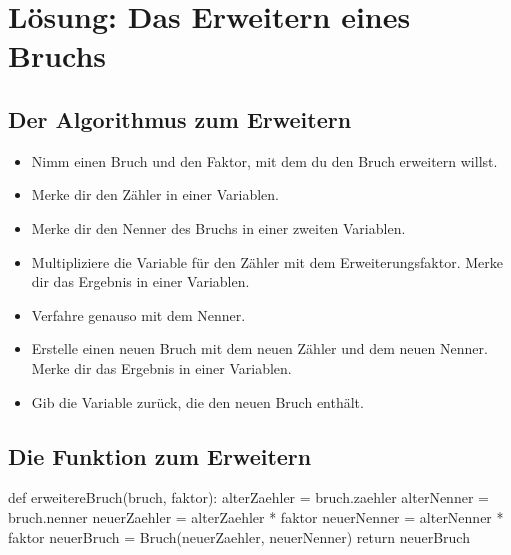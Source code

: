 \section{Lösung: Das Erweitern eines Bruchs}

\subsection*{Der Algorithmus zum Erweitern}

\begin{itemize}
	\item Nimm einen Bruch und den Faktor, mit dem du den Bruch erweitern willst.
	\item Merke dir den Zähler in einer Variablen.
	\item Merke dir den Nenner des Bruchs in einer zweiten Variablen.
	\item Multipliziere die Variable für den Zähler mit dem Erweiterungsfaktor. Merke dir das Ergebnis in einer Variablen.
	\item Verfahre genauso mit dem Nenner.
	\item Erstelle einen neuen Bruch mit dem neuen Zähler und dem neuen Nenner. Merke dir das Ergebnis in einer Variablen.
	\item Gib die Variable zurück, die den neuen Bruch enthält.
\end{itemize}

\subsection*{Die Funktion zum Erweitern}

\begin{codePython}
def erweitereBruch(bruch, faktor):
	alterZaehler = bruch.zaehler
	alterNenner = bruch.nenner
	neuerZaehler = alterZaehler * faktor
	neuerNenner = alterNenner * faktor
	neuerBruch = Bruch(neuerZaehler, neuerNenner)
	return neuerBruch
\end{codePython}

